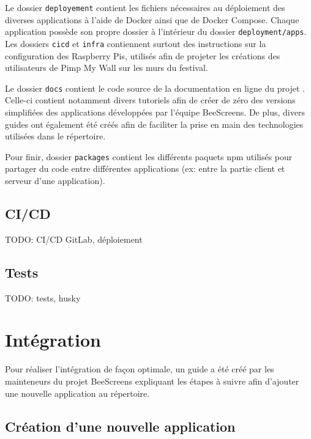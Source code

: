 Le dossier \texttt{deployement} contient les fichiers nécessaires au déploiement des diverses applications à l'aide de Docker ainsi que de Docker Compose. Chaque application possède son propre dossier à l'intérieur du dossier \texttt{deployment/apps}. Les dossiers \texttt{cicd} et \texttt{infra} contiennent surtout des instructions sur la configuration des Raspberry Pis, utilisés afin de projeter les créations des utilisateurs de Pimp My Wall sur les murs du festival.

Le dossier \texttt{docs} contient le code source de la documentation en ligne du projet \cite{beescreensdocs}. Celle-ci contient notamment divers tutoriels afin de créer de zéro des versions simplifiées des applications développées par l'équipe BeeScreens. De plus, divers guides ont également été créés afin de faciliter la prise en main des technologies utilisées dans le répertoire.

Pour finir, dossier \texttt{packages} contient les différents paquets \Gls{npm} utilisés pour partager du code entre différentes applications (ex: entre la partie client et serveur d'une application).

\subsection{CI/CD}

TODO: CI/CD GitLab, déploiement

\subsection{Tests}

TODO: tests, husky

\section{Intégration}

Pour réaliser l'intégration de façon optimale, un guide \cite[text]{addapptobeescreens} a été créé par les mainteneurs du projet BeeScreens expliquant les étapes à suivre afin d'ajouter une nouvelle application au répertoire.

\subsection{Création d'une nouvelle application}

